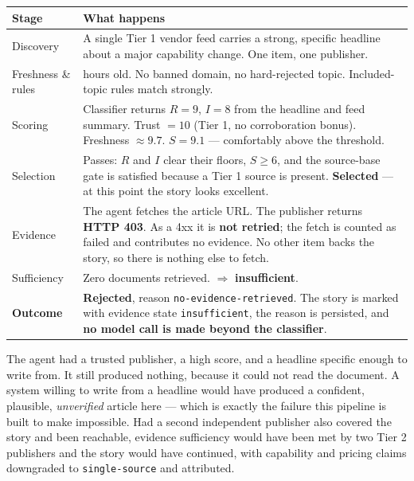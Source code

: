 \documentclass[11pt,a4paper]{article}
\newcommand{\brk}{\hyphenpenalty=0\exhyphenpenalty=0\relax}
\newcommand{\code}[1]{\texttt{\small\brk #1}}
\begin{document}
\begin{center}
\small
\begin{tabularx}{\textwidth}{@{}p{3.9cm} >{\RaggedRight}X@{}}
\toprule
\textbf{Stage} & \textbf{What happens} \\
\midrule
Discovery & A single Tier 1 vendor feed carries a strong, specific headline about
  a major capability change. One item, one publisher. \\
Freshness \& rules & 3 hours old. No banned domain, no hard-rejected topic.
  Included-topic rules match strongly. \\
Scoring & Classifier returns $R=9$, $I=8$ from the headline and feed summary.
  Trust $= 10$ (Tier 1, no corroboration bonus). Freshness $\approx 9.7$.
  $S = 9.1$ --- comfortably above the threshold. \\
Selection & Passes: $R$ and $I$ clear their floors, $S \geq 6$, and the source-base
  gate is satisfied because a Tier 1 source is present.
  \textcolor{aitkGo}{\textbf{Selected}} --- at this point the story looks excellent. \\
Evidence & The agent fetches the article URL. The publisher returns
  \textbf{HTTP 403}. As a 4xx it is \textbf{not retried}; the fetch is counted as
  failed and contributes no evidence. No other item backs the story, so there is
  nothing else to fetch. \\
Sufficiency & Zero documents retrieved.
  $\Rightarrow$ \textbf{insufficient}. \\
\midrule
\textbf{Outcome} & \textcolor{aitkStop}{\textbf{Rejected}}, reason
  \code{no-evidence-retrieved}. The story is marked with evidence state
  \code{insufficient}, the reason is persisted, and \textbf{no model call is made
  beyond the classifier}. \\
\bottomrule
\end{tabularx}
\end{center}

\begin{blockbox}
The agent had a trusted publisher, a high score, and a headline specific enough to
write from. It still produced nothing, because it could not read the document. A
system willing to write from a headline would have produced a confident, plausible,
\emph{unverified} article here --- which is exactly the failure this pipeline is
built to make impossible. Had a second independent publisher also covered the
story and been reachable, evidence sufficiency would have been met by two Tier 2
publishers and the story would have continued, with capability and pricing claims
downgraded to \code{single-source} and attributed.
\end{blockbox}
\end{document}
